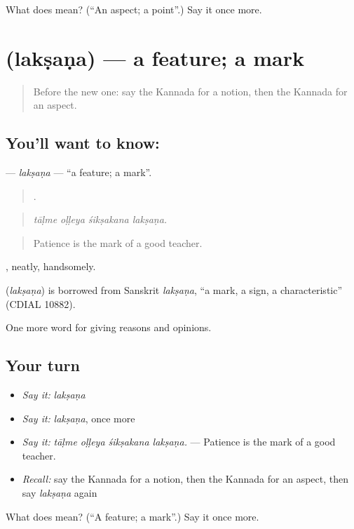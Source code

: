 \begin{tcolorbox}[breakable,colback=teal!4,colframe=teal!35!black,title={Before you move on}]
What does  mean? (\textquotedblleft{}An aspect; a point\textquotedblright{}.) Say it once more.
\end{tcolorbox}
\section[\texorpdfstring{\kn{ಲಕ್ಷಣ} (lakṣaṇa)}{ಲಕ್ಷಣ (lakṣaṇa)}]{ (lakṣaṇa) — a feature; a mark}

\label{lesson:KA-C384-laksana}



\begin{quote}
Before the new one: say the Kannada for a notion, then the Kannada for an aspect.
\end{quote}

\subsection*{You'll want to know: }
\textbf{} — \emph{lakṣaṇa} — \textquotedblleft{}a feature; a mark\textquotedblright{}.

\begin{quote}
   .
\end{quote}

\begin{quote}
\emph{tāḷme oḷḷeya śikṣakana lakṣaṇa.}
\end{quote}

\begin{quote}
Patience is the mark of a good teacher.
\end{quote}

, neatly, handsomely.

\begin{cousinweb}
\textbf{} (\emph{lakṣaṇa}) is borrowed from Sanskrit \emph{lakṣaṇa}, \textquotedblleft{}a mark, a sign, a characteristic\textquotedblright{} (CDIAL 10882).
\end{cousinweb}

\begin{grammarlens}[title={What you've built}]
One more word for giving reasons and opinions.
\end{grammarlens}

\subsection*{Your turn}
\begin{itemize}
\raggedright
  \item \emph{Say it:} \emph{lakṣaṇa}
  \item \emph{Say it:} \emph{lakṣaṇa}, once more
  \item \emph{Say it:} \emph{tāḷme oḷḷeya śikṣakana lakṣaṇa.} — Patience is the mark of a good teacher.
  \item \emph{Recall:} say the Kannada for a notion, then the Kannada for an aspect, then say \emph{lakṣaṇa} again
\end{itemize}

\begin{tcolorbox}[breakable,colback=teal!4,colframe=teal!35!black,title={Before you move on}]
What does  mean? (\textquotedblleft{}A feature; a mark\textquotedblright{}.) Say it once more.
\end{tcolorbox}
